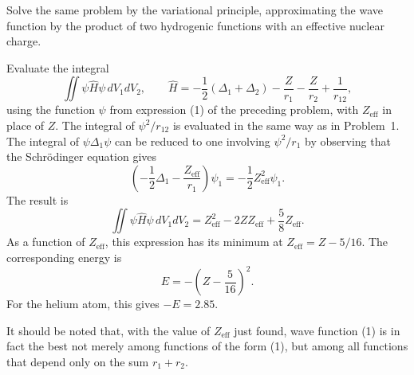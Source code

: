  Solve the same problem by the variational principle, approximating the wave function by the product of two hydrogenic functions with an effective nuclear charge.

\SolutionHeading{} Evaluate the integral
\[
 \iint\psi\hat H\psi\,dV_1dV_2,
 \qquad
 \hat H=-\frac12(\Delta_1+\Delta_2)-\frac Z{r_1}-\frac Z{r_2}+\frac1{r_{12}},
\]
using the function $\psi$ from expression (1) of the preceding problem, with $Z_{\mathrm{eff}}$ in place of $Z$. The integral of $\psi^2/r_{12}$ is evaluated in the same way as in Problem~1. The integral of $\psi\Delta_1\psi$ can be reduced to one involving $\psi^2/r_1$ by observing that the Schr\"odinger equation gives
\[
 \left(-\frac12\Delta_1-\frac{Z_{\mathrm{eff}}}{r_1}\right)\psi_1
 =-\frac12Z_{\mathrm{eff}}^2\psi_1.
\]
The result is
\[
 \iint\psi\hat H\psi\,dV_1dV_2
 =Z_{\mathrm{eff}}^2-2ZZ_{\mathrm{eff}}+\frac58Z_{\mathrm{eff}}.
\]
As a function of $Z_{\mathrm{eff}}$, this expression has its minimum at $Z_{\mathrm{eff}}=Z-5/16$. The corresponding energy is
\[
 E=-\left(Z-\frac5{16}\right)^2.
\]
For the helium atom, this gives $-E=2.85$.

It should be noted that, with the value of $Z_{\mathrm{eff}}$ just found, wave function (1) is in fact the best not merely among functions of the form (1), but among all functions that depend only on the sum $r_1+r_2$.
